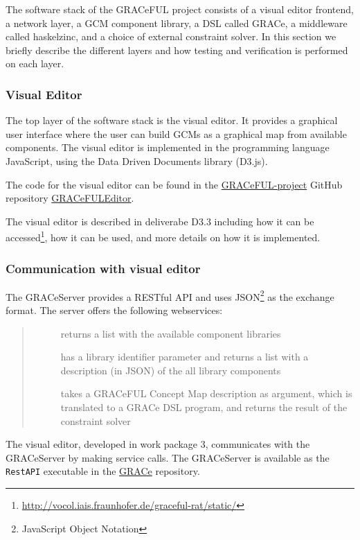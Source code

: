 The software stack of the GRACeFUL project consists of
%
a visual editor frontend,
%
a network layer,
%
a GCM component library,
%
a DSL called GRACe,
%
a middleware called haskelzinc, and
%
a choice of external constraint solver.
%
In this section we briefly describe the different layers and how testing and
verification is performed on each layer.

\subsubsection*{Visual Editor}

The top layer of the software stack is the visual editor.
%
It provides a graphical user interface where the user can build GCMs
as a graphical map from available components.
%
The visual editor is implemented in the programming language JavaScript, using
the Data Driven Documents library (D3.js).
%

The code for the visual editor can be found in the
\href{https://github.com/GRACeFUL-project}{GRACeFUL-project} GitHub
repository
\href{https://github.com/GRACeFUL-project/GRACeFULEditor}{GRACeFULEditor}.


The visual editor is described in deliverabe D3.3 including how it can be
accessed\footnote{\url{http://vocol.iais.fraunhofer.de/graceful-rat/static/}},
how it can be used, and more details on how it is implemented.

\subsubsection*{Communication with visual editor}

The GRACeServer provides a RESTful API and uses JSON\footnote{JavaScript Object
Notation} as the exchange format. The server offers the following webservices:
\begin{quote}
\begin{description}
\item [] returns a list with the available component libraries
\item [] has a library identifier parameter and returns 
  a list with a description (in JSON) of the all library components
\item [] takes a GRACeFUL Concept Map description as
  argument, which is translated to a GRACe DSL program, and returns the result 
  of the constraint solver
\end{description}
\end{quote}
The visual editor, developed in work package 3, communicates with the GRACeServer
by making service calls. The GRACeServer is available as the \texttt{RestAPI} 
executable in the \href{https://github.com/GRACeFUL-project/GRACe}{GRACe} repository.

